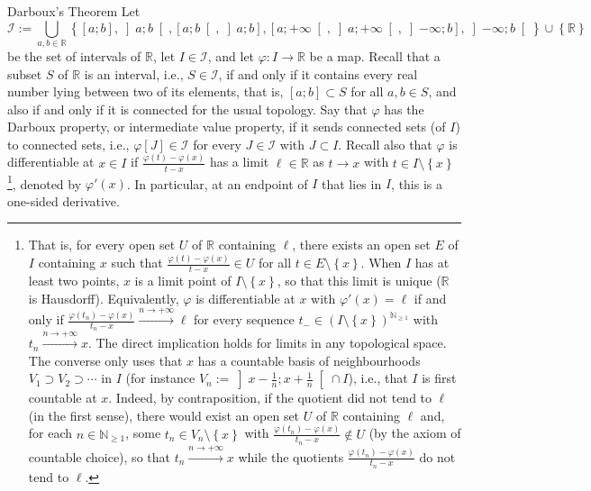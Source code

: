 \begin{appendixitem}{Darboux's Theorem}
    Let
    \[
        \mathcal{I} := \bigcup_{a, b \in \mathbb{R}} \left\{ \left[a;b\right], \left]a;b\right[, \left[a;b\right[, \left]a;b\right], \left[a;+\infty\right[, \left]a;+\infty\right[, \left]-\infty;b\right], \left]-\infty;b\right[ \right\} \cup \left\{ \mathbb{R} \right\}
    \]
    be the set of intervals of \( \mathbb{R} \), let \( I \in \mathcal{I} \), and let \( \varphi \colon I \to \mathbb{R} \) be a map. Recall that a subset \( S \) of \( \mathbb{R} \) is an interval, i.e., \( S \in \mathcal{I} \), if and only if it contains every real number lying between two of its elements, that is, \( \left[a;b\right] \subset S \) for all \( a, b \in S \), and also if and only if it is connected for the usual topology. Say that \( \varphi \) has the Darboux property, or intermediate value property, if it sends connected sets (of \( I \)) to connected sets, i.e., \( \varphi\left[J\right] \in \mathcal{I} \) for every \( J \in \mathcal{I} \) with \( J \subset I \). Recall also that \( \varphi \) is differentiable at \( x \in I \) if \( \frac{\varphi\left(t\right)-\varphi\left(x\right)}{t-x} \) has a limit \( \ell \in \mathbb{R} \) as \( t \to x \) with \( t \in I \setminus \left\{x\right\} \)\footnote{That is, for every open set \( U \) of \( \mathbb{R} \) containing \( \ell \), there exists an open set \( E \) of \( I \) containing \( x \) such that \( \frac{\varphi\left(t\right)-\varphi\left(x\right)}{t-x} \in U \) for all \( t \in E \setminus \left\{x\right\} \). When \( I \) has at least two points, \( x \) is a limit point of \( I \setminus \left\{x\right\} \), so that this limit is unique (\( \mathbb{R} \) is Hausdorff). Equivalently, \( \varphi \) is differentiable at \( x \) with \( \varphi'\left(x\right) = \ell \) if and only if \( \frac{\varphi\left(t_n\right)-\varphi\left(x\right)}{t_n-x} \overset{n \to +\infty}{\longrightarrow} \ell \) for every sequence \( t_{-} \in \left(I \setminus \left\{x\right\}\right)^{\mathbb{N}_{\geq 1}} \) with \( t_n \overset{n \to +\infty}{\longrightarrow} x \). The direct implication holds for limits in any topological space. The converse only uses that \( x \) has a countable basis of neighbourhoods \( V_1 \supset V_2 \supset \cdots \) in \( I \) (for instance \( V_n := \left]x-\frac{1}{n};x+\frac{1}{n}\right[ \cap I \)), i.e., that \( I \) is first countable at \( x \). Indeed, by contraposition, if the quotient did not tend to \( \ell \) (in the first sense), there would exist an open set \( U \) of \( \mathbb{R} \) containing \( \ell \) and, for each \( n \in \mathbb{N}_{\geq 1} \), some \( t_n \in V_n \setminus \left\{x\right\} \) with \( \frac{\varphi\left(t_n\right)-\varphi\left(x\right)}{t_n-x} \notin U \) (by the axiom of countable choice), so that \( t_n \overset{n \to +\infty}{\longrightarrow} x \) while the quotients \( \frac{\varphi\left(t_n\right)-\varphi\left(x\right)}{t_n-x} \) do not tend to \( \ell \).}, denoted by \( \varphi'\left(x\right) \). In particular, at an endpoint of \( I \) that lies in \( I \), this is a one-sided derivative.

\end{appendixitem}
